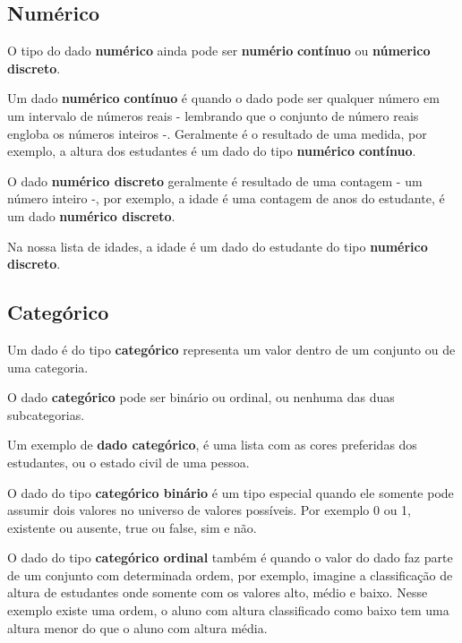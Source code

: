 \documentclass[
]{book}
\begin{document}
\hypertarget{numuxe9rico}{%
\subsection{Numérico}\label{numuxe9rico}}

O tipo do dado \textbf{numérico} ainda pode ser \textbf{numério} \textbf{contínuo} ou \textbf{númerico} \textbf{discreto}.

Um dado \textbf{numérico} \textbf{contínuo} é quando o dado pode ser qualquer número em um intervalo de números reais - lembrando que o conjunto de número reais engloba os números inteiros -. Geralmente é o resultado de uma medida, por exemplo, a altura dos estudantes é um dado do tipo \textbf{numérico} \textbf{contínuo}.

O dado \textbf{numérico discreto} geralmente é resultado de uma contagem - um número inteiro -, por exemplo, a idade é uma contagem de anos do estudante, é um dado \textbf{numérico discreto}.

Na nossa lista de idades, a idade é um dado do estudante do tipo \textbf{numérico discreto}.

\hypertarget{categuxf3rico}{%
\subsection{Categórico}\label{categuxf3rico}}

Um dado é do tipo \textbf{categórico} representa um valor dentro de um conjunto ou de uma categoria.

O dado \textbf{categórico} pode ser binário ou ordinal, ou nenhuma das duas subcategorias.

Um exemplo de \textbf{dado categórico}, é uma lista com as cores preferidas dos estudantes, ou o estado civil de uma pessoa.

O dado do tipo \textbf{categórico binário} é um tipo especial quando ele somente pode assumir dois valores no universo de valores possíveis. Por exemplo 0 ou 1, existente ou ausente, true ou false, sim e não.

O dado do tipo \textbf{categórico ordinal} também é quando o valor do dado faz parte de um conjunto com determinada ordem, por exemplo, imagine a classificação de altura de estudantes onde somente com os valores alto, médio e baixo. Nesse exemplo existe uma ordem, o aluno com altura classificado como baixo tem uma altura menor do que o aluno com altura média.
\end{document}
